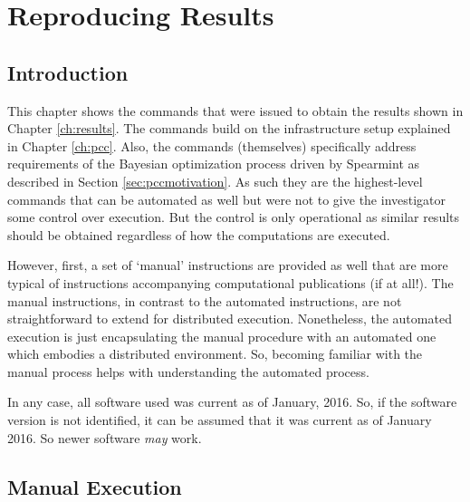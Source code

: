 \chapter{Reproducing Results}
\label{ch:reproduce}



\section{Introduction}


This chapter shows the commands that were issued to obtain the results shown in Chapter \ref{ch:results}.
% 
The commands build on the infrastructure setup explained in Chapter \ref{ch:pcc}.
% 
Also, the commands (themselves) specifically address requirements of the Bayesian optimization process driven by \textsf{Spearmint} as described in Section \ref{sec:pccmotivation}.
% 
As such they are the highest-level commands that can be automated as well but were not to give the investigator some control over execution.
% 
But the control is only operational as similar results should be obtained regardless of how the computations are executed.


However, first, a set of `manual' instructions are provided as well that are more typical of instructions accompanying computational publications (if at all!).
% 
The manual instructions, in contrast to the automated instructions, are not straightforward to extend for distributed execution.
% 
Nonetheless, the automated execution is just encapsulating the manual procedure with an automated one which embodies a distributed environment.
%
So, becoming familiar with the manual process helps with understanding the automated process.


In any case, all software used was current as of January, 2016.
% 
So, if the software version is not identified, it can be assumed that it was current as of January 2016.
% 
So newer software \emph{may} work.



\section{Manual Execution}
\label{sec:manual}



